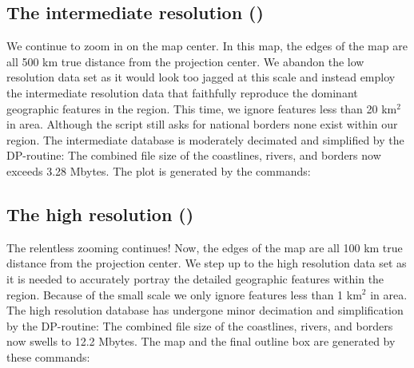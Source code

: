  



\subsection{The intermediate resolution ()} 

We continue to zoom in on the map center.  In this map, the
edges of the map are all 500 km true distance from the projection
center.  We abandon the low resolution data set as it would look
too jagged at this scale and instead employ the intermediate
resolution data that faithfully reproduce the dominant geographic
features in the region.  This time, we ignore features less than
20 km$^2$ in area.  Although the script still asks for national
borders none exist within our region.  The intermediate database
is moderately decimated and simplified by the DP-routine: The
combined file size of the coastlines, rivers, and borders now
exceeds 3.28 Mbytes.  The plot is generated by the commands:

 



\subsection{The high resolution ()} 

The relentless zooming continues!  Now, the edges of the map
are all 100 km true distance from the projection center.  We
step up to the high resolution data set as it is needed to
accurately portray the detailed geographic features within the
region.  Because of the small scale we only ignore features less
than 1 km$^2$ in area.  The high resolution database has undergone
minor decimation and simplification by the DP-routine: The
combined file size of the coastlines, rivers, and borders now
swells to 12.2 Mbytes.  The map and the final outline box are
generated by these commands:

 

